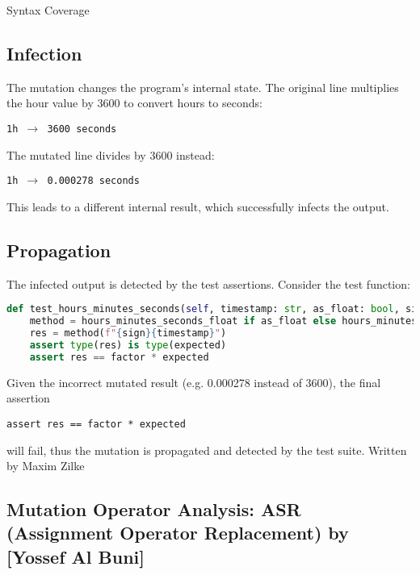 \documentclass[a4paper]{scrreprt}
\newcounter{question}
\begin{document}
\begin{question}{Syntax Coverage}
\begin{enumerate}[topsep=0pt, leftmargin=*]
\begin{answer}
\subsection*{Infection}

The mutation changes the program’s internal state. The original line multiplies the hour value by 3600 to convert hours to seconds:

\begin{center}
\texttt{1h $\rightarrow$ 3600 seconds}
\end{center}

The mutated line divides by 3600 instead:

\begin{center}
\texttt{1h $\rightarrow$ 0.000278 seconds}
\end{center}

This leads to a different internal result, which successfully infects the output.

\subsection*{Propagation}

The infected output is detected by the test assertions. Consider the test function:

\begin{lstlisting}[language=python]
def test_hours_minutes_seconds(self, timestamp: str, as_float: bool, sign: str, factor: int, expected: float):
    method = hours_minutes_seconds_float if as_float else hours_minutes_seconds
    res = method(f"{sign}{timestamp}")
    assert type(res) is type(expected)
    assert res == factor * expected
\end{lstlisting}

Given the incorrect mutated result (e.g. 0.000278 instead of 3600), the final assertion

\begin{center}
\texttt{assert res == factor * expected}
\end{center}

will fail, thus the mutation is propagated and detected by the test suite. Written by Maxim Zilke 



\subsection*{Mutation Operator Analysis: ASR (Assignment Operator Replacement) by \textbf{[Yossef Al Buni]}}


\end{answer}
\end{enumerate}
\end{question}
\end{document}
